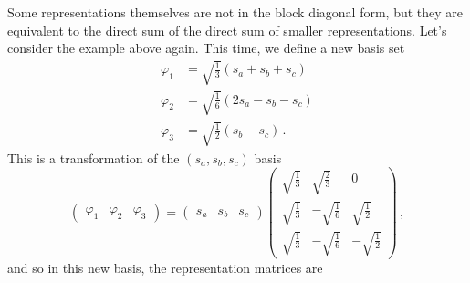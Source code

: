 \documentclass{article}
\theoremstyle{plain}\theoremheaderfont{\normalfont\itshape}\theorembodyfont{\rmfamily}\theoremseparator{.}\newtheorem*{rem}{Remark}\newtheorem*{ex}{Example}\newtheorem*{proof}{Proof}\newtheorem*{altp}{Alternative proof}
\theoremstyle{plain}\theoremheaderfont{\normalfont\bfseries}\theorembodyfont{\rmfamily}\theoremseparator{.}\newtheorem{thm}{Theorem}[section]\newtheorem{lem}[thm]{Lemma}\newtheorem{prop}[thm]{Proposition}\newtheorem*{cor}{Corollary}\newtheorem{defn}[thm]{Definition}\newtheorem{clm}[thm]{Claim}\newtheorem{clminproof}{Claim}\newtheorem*{law}{Law}\newtheorem{pos}[thm]{Postulate}
\theoremstyle{break}\theoremheaderfont{\normalfont\itshape}\theorembodyfont{\rmfamily}\theoremseparator{.\medskip}\newtheorem*{proofskip}{Proof}\newtheorem*{exs}{Examples}\newtheorem*{rems}{Remarks}
\theoremstyle{break}\theoremheaderfont{\normalfont\bfseries}\theorembodyfont{\rmfamily}\theoremseparator{.\medskip}\newtheorem{lemskip}[thm]{Lemma}\newtheorem{defnskip}[thm]{Definition}\newtheorem{propskip}[thm]{Proposition}\newtheorem{thmskip}[thm]{Theorem}
\numberwithin{equation}{section}
\begin{document}
    Some representations themselves are not in the block diagonal form, but they are equivalent to the direct sum of the direct sum of smaller representations. Let's consider the example above again. This time, we define a new basis set
    \begin{equation}
        \begin{aligned}
            \varphi_1&=\sqrt{\frac{1}{3}}(s_a+s_b+s_c) \\
            \varphi_2&=\sqrt{\frac{1}{6}}(2s_a-s_b-s_c) \\
            \varphi_3&=\sqrt{\frac{1}{2}}(s_b-s_c)\,.
        \end{aligned}
    \end{equation}
    This is a transformation of the \((s_a,s_b,s_c)\) basis
    \begin{equation}
        \begin{pmatrix}
            \varphi_1 & \varphi_2 & \varphi_3
        \end{pmatrix}=\begin{pmatrix}
            s_a & s_b & s_c
        \end{pmatrix}\begin{pmatrix}
            \sqrt{\frac{1}{3}} & \sqrt{\frac{2}{3}} & 0 \\
            \sqrt{\frac{1}{3}} & -\sqrt{\frac{1}{6}} & \sqrt{\frac{1}{2}} \\
            \sqrt{\frac{1}{3}} & -\sqrt{\frac{1}{6}} & -\sqrt{\frac{1}{2}}
        \end{pmatrix}\,,
    \end{equation}
    and so in this new basis, the representation matrices are
\end{document}

